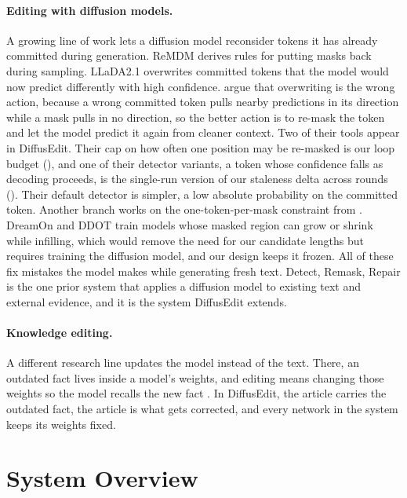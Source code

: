 \documentclass[]{paper}
\begin{document}
\paragraph{Editing with diffusion models.}
A growing line of work lets a diffusion model reconsider tokens it has already committed during generation. ReMDM \citep{wang-etal-2025-remasking} derives rules for putting masks back during sampling. LLaDA2.1 \citep{bie-etal-2026-llada21} overwrites committed tokens that the model would now predict differently with high confidence. \citet{yao-2026-remask} argue that overwriting is the wrong action, because a wrong committed token pulls nearby predictions in its direction while a mask pulls in no direction, so the better action is to re-mask the token and let the model predict it again from cleaner context. Two of their tools appear in DiffusEdit. Their cap on how often one position may be re-masked is our loop budget (), and one of their detector variants, a token whose confidence falls as decoding proceeds, is the single-run version of our staleness delta across rounds (). Their default detector is simpler, a low absolute probability on the committed token. Another branch works on the one-token-per-mask constraint from . DreamOn \citep{wu-etal-2026-dreamon} and DDOT \citep{zhang-etal-2025-ddot} train models whose masked region can grow or shrink while infilling, which would remove the need for our candidate lengths but requires training the diffusion model, and our design keeps it frozen. All of these fix mistakes the model makes while generating fresh text. Detect, Remask, Repair \citep{zou-etal-2026-detect} is the one prior system that applies a diffusion model to existing text and external evidence, and it is the system DiffusEdit extends.

\paragraph{Knowledge editing.}
A different research line updates the model instead of the text. There, an outdated fact lives inside a model's weights, and editing means changing those weights so the model recalls the new fact \citep{meng-etal-2022-rome}. In DiffusEdit, the article carries the outdated fact, the article is what gets corrected, and every network in the system keeps its weights fixed.

\section{System Overview}
\label{sec:overview}
\end{document}
